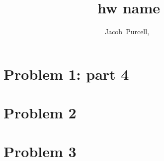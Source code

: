 \documentclass[journal]{IEEEtran}
\begin{document}
\title{hw name}

\author{Jacob~Purcell,~}

\maketitle
\section{Problem 1: part 4}

\section{Problem 2}

\section{Problem 3}
\end{document}
